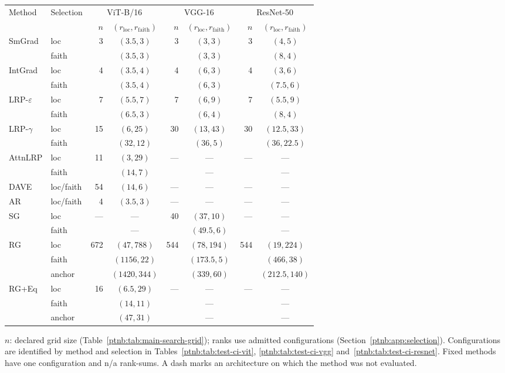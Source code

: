 \begin{tabular}{@{}ll rc rc rc@{}}
\toprule
Method & Selection & \multicolumn{2}{c}{ViT-B/16} & \multicolumn{2}{c}{VGG-16} & \multicolumn{2}{c}{ResNet-50} \\
 & & $n$ & $(r_{\mathrm{loc}},r_{\mathrm{faith}})$ & $n$ & $(r_{\mathrm{loc}},r_{\mathrm{faith}})$ & $n$ & $(r_{\mathrm{loc}},r_{\mathrm{faith}})$ \\
\midrule
SmGrad & loc & 3 & $(3.5,3)$ & 3 & $(3,3)$ & 3 & $(4,5)$ \\
 & faith &  & $(3.5,3)$ &  & $(3,3)$ &  & $(8,4)$ \\
\addlinespace
IntGrad & loc & 4 & $(3.5,4)$ & 4 & $(6,3)$ & 4 & $(3,6)$ \\
 & faith &  & $(3.5,4)$ &  & $(6,3)$ &  & $(7.5,6)$ \\
\addlinespace
LRP-$\varepsilon$ & loc & 7 & $(5.5,7)$ & 7 & $(6,9)$ & 7 & $(5.5,9)$ \\
 & faith &  & $(6.5,3)$ &  & $(6,4)$ &  & $(8,4)$ \\
\addlinespace
LRP-$\gamma$ & loc & 15 & $(6,25)$ & 30 & $(13,43)$ & 30 & $(12.5,33)$ \\
 & faith &  & $(32,12)$ &  & $(36,5)$ &  & $(36,22.5)$ \\
\addlinespace
AttnLRP & loc & 11 & $(3,29)$ & --- & --- & --- & --- \\
 & faith &  & $(14,7)$ &  & --- &  & --- \\
\addlinespace
DAVE & loc/faith & 54 & $(14,6)$ & --- & --- & --- & --- \\
\addlinespace
AR & loc/faith & 4 & $(3.5,3)$ & --- & --- & --- & --- \\
\addlinespace
SG & loc & --- & --- & 40 & $(37,10)$ & --- & --- \\
 & faith &  & --- &  & $(49.5,6)$ &  & --- \\
\addlinespace
RG & loc & 672 & $(47,788)$ & 544 & $(78,194)$ & 544 & $(19,224)$ \\
 & faith &  & $(1156,22)$ &  & $(173.5,5)$ &  & $(466,38)$ \\
 & anchor &  & $(1420,344)$ &  & $(339,60)$ &  & $(212.5,140)$ \\
\addlinespace
RG+Eq & loc & 16 & $(6.5,29)$ & --- & --- & --- & --- \\
 & faith &  & $(14,11)$ &  & --- &  & --- \\
 & anchor &  & $(47,31)$ &  & --- &  & --- \\
\bottomrule
\end{tabular}
\par\smallskip\noindent
$n$: declared grid size (Table~\ref{ptnb:tab:main-search-grid}); ranks use admitted configurations (Section~\ref{ptnb:app:selection}).
Configurations are identified by method and selection in Tables~\ref{ptnb:tab:test-ci-vit}, \ref{ptnb:tab:test-ci-vgg} and~\ref{ptnb:tab:test-ci-resnet}.
Fixed methods have one configuration and n/a rank-sums. A dash marks an architecture on which the method was not evaluated.
